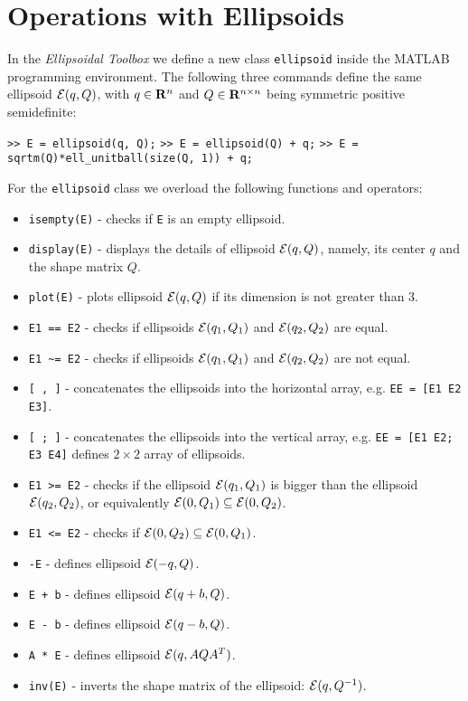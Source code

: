 \section{Operations with Ellipsoids}
In the {\it Ellipsoidal Toolbox} we define a new class {\tt ellipsoid} inside
the MATLAB programming environment. The following three commands
define the same ellipsoid $\EE(q,Q)$, with $q\in{\bf R}^n$ and
$Q\in{\bf R}^{n\times n}$ being symmetric positive semidefinite:

{\tt >> E = ellipsoid(q, Q);}
\newline
{\tt >> E = ellipsoid(Q) + q;}
\newline
{\tt >> E = sqrtm(Q)*ell\_unitball(size(Q, 1)) + q;}

For the {\tt ellipsoid} class we overload the following functions and operators:
\begin{itemize}
\item {\tt isempty(E)} - checks if {\tt E} is an empty ellipsoid.
\item {\tt display(E)} - displays the details of ellipsoid $\EE(q,Q)$, namely,
its center $q$ and the shape matrix $Q$.
\item {\tt plot(E)} - plots ellipsoid $\EE(q,Q)$ if its dimension is not greater
than 3.
\item {\tt E1 == E2} - checks if ellipsoids $\EE(q_1,Q_1)$ and
$\EE(q_2,Q_2)$ are equal.
\item {\tt E1 \~{ }= E2} - checks if ellipsoids $\EE(q_1,Q_1)$ and
$\EE(q_2,Q_2)$ are not equal.
\item {\tt [ , ]} - concatenates the ellipsoids into the horizontal array, e.g.
{\tt EE = [E1 E2 E3]}.
\item {\tt [ ; ]} - concatenates the ellipsoids into the vertical array, e.g.
{\tt EE = [E1 E2; E3 E4]} defines $2\times 2$ array of ellipsoids.
\item {\tt E1 >= E2} - checks if the ellipsoid $\EE(q_1,Q_1)$ is bigger than
the ellipsoid $\EE(q_2,Q_2)$, or equivalently $\EE(0,Q_1)\subseteq\EE(0,Q_2)$.
\item {\tt E1 <= E2} - checks if $\EE(0,Q_2)\subseteq\EE(0,Q_1)$.
\item {\tt -E} - defines ellipsoid $\EE(-q,Q)$.
\item {\tt E + b} - defines ellipsoid $\EE(q+b,Q)$.
\item {\tt E - b} - defines ellipsoid $\EE(q-b,Q)$.
\item {\tt A * E} - defines ellipsoid $\EE(q,AQA^T)$.
\item {\tt inv(E)} - inverts the shape matrix of the ellipsoid: $\EE(q,Q^{-1})$.
\end{itemize}
